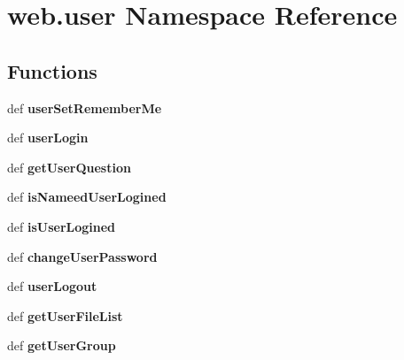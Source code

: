 \hypertarget{namespaceweb_1_1user}{\section{web.\-user Namespace Reference}
\label{namespaceweb_1_1user}
}
\subsection*{Functions}
\begin{DoxyCompactItemize}
\item 
\hypertarget{namespaceweb_1_1user_abc5c01a718c5fbe455f9e3d7e4a1be8c}{def {\bfseries user\-Set\-Remember\-Me}}\label{namespaceweb_1_1user_abc5c01a718c5fbe455f9e3d7e4a1be8c}

\item 
\hypertarget{namespaceweb_1_1user_a18010cc8915fb5842636d8db4774d041}{def {\bfseries user\-Login}}\label{namespaceweb_1_1user_a18010cc8915fb5842636d8db4774d041}

\item 
\hypertarget{namespaceweb_1_1user_ad9a3fcd158779b725194a3ff92b171e6}{def {\bfseries get\-User\-Question}}\label{namespaceweb_1_1user_ad9a3fcd158779b725194a3ff92b171e6}

\item 
\hypertarget{namespaceweb_1_1user_af5687cf4f00354107c94a03eac017496}{def {\bfseries is\-Nameed\-User\-Logined}}\label{namespaceweb_1_1user_af5687cf4f00354107c94a03eac017496}

\item 
\hypertarget{namespaceweb_1_1user_a38fcd46ce0e5fd094569f50175317c30}{def {\bfseries is\-User\-Logined}}\label{namespaceweb_1_1user_a38fcd46ce0e5fd094569f50175317c30}

\item 
\hypertarget{namespaceweb_1_1user_a1e8cb3da4ff08ce9aa68c24c79dcc4d4}{def {\bfseries change\-User\-Password}}\label{namespaceweb_1_1user_a1e8cb3da4ff08ce9aa68c24c79dcc4d4}

\item 
\hypertarget{namespaceweb_1_1user_a426bfbbae764bd023f6fee52a3782535}{def {\bfseries user\-Logout}}\label{namespaceweb_1_1user_a426bfbbae764bd023f6fee52a3782535}

\item 
\hypertarget{namespaceweb_1_1user_aa0ff67d8d0604dab33c58f9c34104c47}{def {\bfseries get\-User\-File\-List}}\label{namespaceweb_1_1user_aa0ff67d8d0604dab33c58f9c34104c47}

\item 
\hypertarget{namespaceweb_1_1user_a0c638af1e9b3e433edcd3ba5a2a905cb}{def {\bfseries get\-User\-Group}}\label{namespaceweb_1_1user_a0c638af1e9b3e433edcd3ba5a2a905cb}


\end{DoxyCompactItemize}
